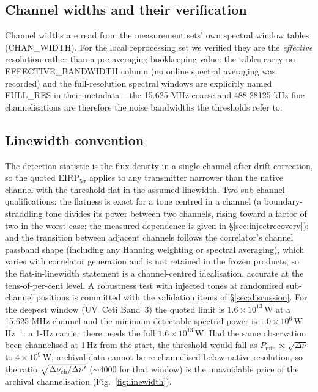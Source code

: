 \documentclass{openjournal}
\begin{document}
\subsection*{Channel widths and their verification}

Channel widths are read from the measurement sets' own spectral window
tables (CHAN\_WIDTH). For the local reprocessing set we verified they
are the \emph{effective} resolution rather than a pre-averaging
bookkeeping value: the tables carry no EFFECTIVE\_BANDWIDTH column
(no online spectral averaging was recorded) and the full-resolution
spectral windows are explicitly named FULL\_RES in their metadata --
the 15.625-MHz coarse and 488.28125-kHz fine channelisations are
therefore the noise bandwidths the thresholds refer to.

\subsection*{Linewidth convention}

The detection statistic is the flux density in a single channel after
drift correction, so the quoted EIRP$_{5\sigma}$ applies to any
transmitter narrower than the native channel with the threshold flat
in the assumed linewidth. Two sub-channel qualifications: the flatness
is exact for a tone centred in a channel (a boundary-straddling tone
divides its power between two channels, rising toward a factor of two
in the worst case; the measured dependence is given in
\S\ref{sec:injectrecovery}); and the transition between adjacent
channels follows the correlator's channel passband shape (including
any Hanning weighting or spectral averaging), which varies with
correlator generation and is not retained in the frozen products, so
the flat-in-linewidth statement is a channel-centred idealisation,
accurate at the tens-of-per-cent level. A robustness test with
injected tones at randomised sub-channel positions is committed with
the validation items of \S\ref{sec:discussion}. For the deepest
window (UV~Ceti Band~3) the quoted limit is
$1.6\times10^{13}$\,W at a 15.625-MHz channel and the minimum
detectable spectral power is $1.0\times10^{6}$\,W\,Hz$^{-1}$: a 1-Hz
carrier there needs the full $1.6\times10^{13}$\,W. Had the same
observation been channelised at 1\,Hz from the start, the threshold
would fall as $P_{\min} \propto \sqrt{\Delta\nu}$ to
$4\times10^{9}$\,W; archival data cannot be re-channelised below
native resolution, so the ratio
$\sqrt{\Delta\nu_{\rm ch}/\Delta\nu'}$ (${\sim}4000$ for that window)
is the unavoidable price of the archival channelisation
(Fig.~\ref{fig:linewidth}).
\end{document}
